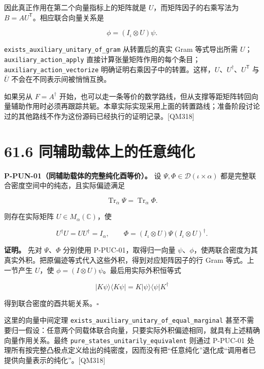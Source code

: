 \documentclass[
  11pt,
  oneside]{book}
\begin{document}
因此真正作用在第二个向量指标上的矩阵就是 \(U\)，而矩阵因子的右乘写法为
\(B=AU^\mathsf T\)。相应联合向量关系是

\[
\phi=(I_\iota\otimes U)\psi.
\]

\texttt{exists\_\allowbreak auxiliary\_\allowbreak unitary\_\allowbreak of\_\allowbreak gram} 从转置后的真实 Gram
等式导出所需 \(U\)；\texttt{auxiliary\_\allowbreak action\_\allowbreak apply}
直接计算张量矩阵作用的每个条目；\texttt{auxiliary\_\allowbreak action\_\allowbreak vectorize}
明确证明右乘因子中的转置。这样，\(U\)、\(U^\dagger\)、\(U^\mathsf T\) 与
\(\overline U\) 不会在不同表示间被悄悄互换。

如果另从 \(F=A^\dagger\)
开始，也可以走一条等价的数学路线，但从支撑等距矩阵转回向量辅助作用时必须再跟踪共轭。本章实际实现采用上面的转置路线；准备阶段讨论过的其他路线不作为这份源码已经执行的证明记录。{[}QM318{]}

\hypertarget{ux540cux8f85ux52a9ux8f7dux4f53ux4e0aux7684ux4efbux610fux7eafux5316}{%
\section{61.6
同辅助载体上的任意纯化}\label{ux540cux8f85ux52a9ux8f7dux4f53ux4e0aux7684ux4efbux610fux7eafux5316}}

\protect\hypertarget{p-pun-01}{}{}

\textbf{P-PUN-01（同辅助载体的完整纯化酉等价）。} 设
\(\Psi,\Phi\in\mathcal D(\iota\times\alpha)\)
都是完整联合密度空间中的纯态，且实际偏迹满足

\[
\operatorname{Tr}_\alpha\Psi=\operatorname{Tr}_\alpha\Phi.
\]

则存在实际矩阵 \(U\in M_\alpha(\mathbb C)\)，使

\[
U^\dagger U=UU^\dagger=I_\alpha,
\qquad
\Phi=(I_\iota\otimes U)\Psi(I_\iota\otimes U)^\dagger.
\]

\textbf{证明。} 先对 \(\Psi\)、\(\Phi\) 分别使用 P-PUC-01，取得归一向量
\(\psi\)、\(\phi\)，使两联合密度为其真实外积。把原偏迹等式代入这些外积，得到对应矩阵因子的行
Gram 等式。上一节产生 \(U\)，使
\(\phi=(I\otimes U)\psi\)。最后用实际外积恒等式

\[
|K\psi\rangle\langle K\psi|
=K|\psi\rangle\langle\psi|K^\dagger
\]

得到联合密度的酉共轭关系。\(\square\)

这里的向量中间定理
\texttt{exists\_\allowbreak auxiliary\_\allowbreak unitary\_\allowbreak of\_\allowbreak equal\_\allowbreak marginal}
甚至不需要归一假设：任意两个同载体联合向量，只要实际外积偏迹相同，就具有上述精确向量作用关系。最终
\texttt{pure\_\allowbreak states\_\allowbreak unitarily\_\allowbreak equivalent} 则通过 P-PUC-01
处理所有按完整凸极点定义给出的纯密度，因而没有把``任意纯化''退化成``调用者已提供向量表示的纯化''。{[}QM318{]}
\end{document}
